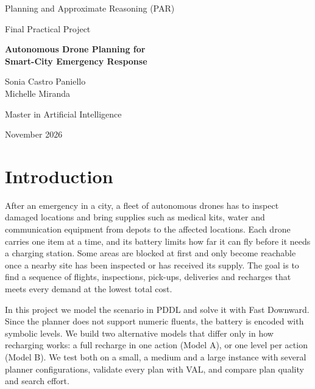 \documentclass[11pt,a4paper]{article}
\begin{document}
\begin{titlepage}
  \centering
  \vspace*{3cm}
  {\Large Planning and Approximate Reasoning (PAR)\par}
  \vspace{0.5cm}
  {\large Final Practical Project\par}
  \vspace{2cm}
  {\huge\bfseries Autonomous Drone Planning for\\[0.3cm] Smart-City Emergency Response\par}
  \vspace{2cm}
  {\Large Sonia Castro Paniello\\[0.2cm] Michelle Miranda\par}
  \vfill
  {\large Master in Artificial Intelligence\par}
  \vspace{0.3cm}
  {\large November 2026\par}
\end{titlepage}

\tableofcontents
\newpage


\section{Introduction}

After an emergency in a city, a fleet of autonomous drones has to inspect
damaged locations and bring supplies such as medical kits, water and
communication equipment from depots to the affected locations. Each drone carries one item at a time, and its battery
limits how far it can fly before it needs a charging station. Some areas are
blocked at first and only become reachable once a nearby site has been
inspected or has received its supply. The goal is to
find a sequence of flights, inspections, pick-ups, deliveries and recharges
that meets every demand at the lowest total cost.

In this project we model the scenario in PDDL and solve it with Fast Downward.
Since the planner does not support numeric fluents, the battery is encoded with
symbolic levels. We build two alternative models that differ only in how
recharging works: a full recharge in one action (Model A), or one level per
action (Model B). We test both on a small, a medium and a large instance with
several planner configurations, validate every plan with VAL, and compare
plan quality and search effort.
\end{document}
